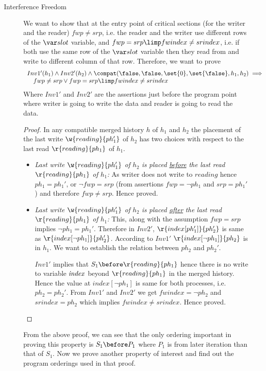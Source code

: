 \begin{description}
 \item [Interference Freedom]
We want to show that at the entry point of critical sections (for the writer and the reader) $fwp\neq srp$, 
i.e. the reader and the writer use different rows of the $\slot$ variable, and 
$fwp=srp \limp fwindex\neq srindex$, i.e. if both use the same row of the $\slot$ variable then 
they read from and write to different column of that row. 
Therefore, we want to prove 
\[
\begin{array}{l}
 Inv1'(h_1) \land Inv2'(h_2) \land \compat(\false,\false,\set{0},\set{\false},h_1,h_2) \implies \\
~~~fwp\neq srp \lor fwp=srp \limp fwindex\neq srindex
\end{array}
\]
Where $Inv1'$ and $Inv2'$ are the assertions just before the program point where writer is going to write the data and reader is going to read the data.
\begin{proof}
In any compatible merged history $h$ of $h_1$ and $h_2$ the placement of the last write $\w{reading}{ph_1'}$ of $h_2$ has 
two choices with respect to the last read $\r{reading}{ph_1}$ of $h_1$.
\begin{itemize}
 \item \textit{Last write $\w{reading}{ph_1'}$ of $h_2$ is placed \ul{before} the last read $\r{reading}{ph_1}$ of $h_1$:} As writer does not 
write to $reading$ hence $ph_1=ph_1'$, or $\neg fwp=srp$ (from assertions $fwp=\neg ph_1$ and $srp=ph_1'$) and therefore $fwp\neq srp$. Hence proved.

 \item \textit{Last write $\w{reading}{ph_1'}$ of $h_2$ is placed \ul{after} the last read $\r{reading}{ph_1}$ of $h_1$:} This, along with the assumption $fwp=srp$ implies
$\neg ph_1 = ph_1'$. Therefore in $Inv2'$, $\r{index[ph_1']}{ph_2'}$ is same as $\r{index[\neg ph_1]}{ph_2'}$. According to $Inv1'$ 
$\r{index[\neg ph_1]}{ph_2}$ is in $h_1$. We want to establish the relation between $ph_2$ and $ph_2'$.

$Inv1'$ implies that \ul{$S_1\before \r{reading}{ph_1}$} hence there is no write to variable $\mathit{index}$ beyond $\r{reading}{ph_1}$ in the merged history. 
Hence the value at $index[\neg ph_1]$ is same for both processes, i.e. $ph_2=ph_2'$. From $Inv1'$ and $Inv2'$ we get $fwindex=\neg ph_2$ and $srindex=ph_2$
which implies $fwindex\neq srindex$. Hence proved. 
\end{itemize}
\end{proof}
From the above proof, we can see that the only ordering important in proving this property is $S_1\before P_1$ where $P_1$ is from later iteration than that of $S_1$. Now
we prove another property of interest and find out the program orderings used in that proof.


\end{description}
